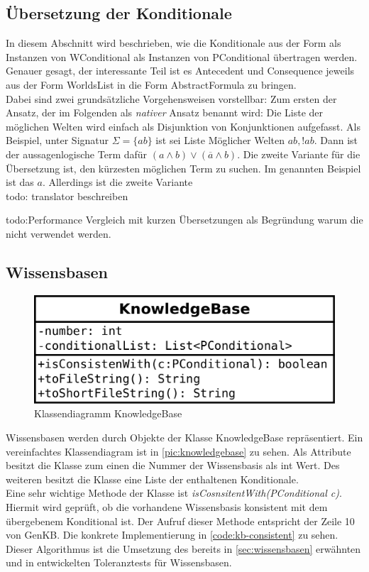 \documentclass[12pt,a4paper]{article}
\begin{document}
\subsection{Übersetzung der Konditionale}
\label{sec:übersetzung}
In diesem Abschnitt wird beschrieben, wie die Konditionale aus der Form als Instanzen von WConditional als Instanzen von PConditional übertragen werden. Genauer gesagt, der interessante Teil ist es Antecedent und Consequence jeweils aus der Form WorldsList in die Form AbstractFormula zu bringen. \\
Dabei sind zwei grundsätzliche Vorgehensweisen vorstellbar: Zum ersten der Ansatz, der im Folgenden als \textit{nativer} Ansatz benannt wird: Die Liste der möglichen Welten wird einfach als Disjunktion von Konjunktionen aufgefasst. Als Beispiel, unter Signatur $\Sigma=\{ab\}$ ist sei Liste Möglicher Welten $ab, !ab$. Dann ist der aussagenlogische Term dafür $(a \wedge b) \vee (\overline{a}\wedge b)$. Die zweite Variante für die Übersetzung ist, den kürzesten möglichen Term zu suchen. Im genannten Beispiel ist das $a$. Allerdings ist die zweite Variante
\\
todo: translator beschreiben

todo:Performance Vergleich mit kurzen Übersetzungen als Begründung warum die nicht verwendet werden.
\subsection{Wissensbasen}


\begin{figure}
\includegraphics[width=0.45\linewidth]{bilder/KnowledgeBase.png}
\caption{Klassendiagramm KnowledgeBase}
\label{pic:knowledgebase}
\end{figure}



Wissensbasen werden durch Objekte der Klasse KnowledgeBase repräsentiert. Ein vereinfachtes Klassendiagram ist in \autoref{pic:knowledgebase} zu sehen. Als Attribute besitzt die Klasse zum einen die Nummer der Wissensbasis als int Wert. Des weiteren besitzt die Klasse eine Liste der enthaltenen Konditionale.  \\
Eine sehr wichtige Methode der Klasse ist \textit{isCosnsitentWith(PConditional c)}. Hiermit wird geprüft, ob die vorhandene Wissensbasis konsistent mit dem übergebenem Konditional ist. Der Aufruf dieser Methode entspricht der Zeile 10 von GenKB. Die konkrete Implementierung in \autoref{code:kb-consistent} zu sehen. Dieser Algorithmus ist die Umsetzung des bereits in \autoref{sec:wissensbasen} erwähnten und in \cite{goldszmidt96} entwickelten Toleranztests für Wissensbasen. 
\end{document}
